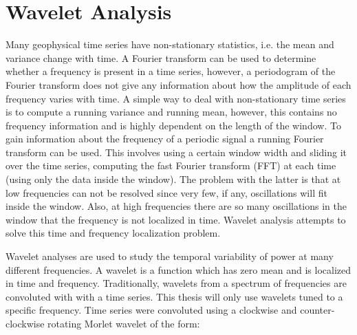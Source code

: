



\section{Wavelet Analysis}

Many geophysical time series have non-stationary statistics, i.e. the mean and variance change with time.
A Fourier transform can be used to determine whether a frequency is present in a time series, however, a periodogram of the Fourier transform does not give any information about 
how the amplitude of each frequency varies with time.  A simple way to deal with non-stationary time series is to compute a running variance and running mean, however,  this contains 
no frequency information and is highly dependent on the length of the window. To gain information about the frequency of a periodic signal a running
Fourier transform can be used. This involves using a certain window width and sliding it over the time series, computing the fast Fourier transform (FFT)
at each time (using only the data inside the window). The problem with the latter is that at low frequencies can not be resolved since very few, if any, oscillations will fit inside the window. Also, 
at high frequencies there are so many oscillations in the window that the frequency is not localized in time. Wavelet analysis attempts to solve this time and frequency localization
problem. 

Wavelet analyses are used to study the temporal variability of power at many different frequencies.  A wavelet is a function which has zero mean and 
is localized in time and frequency.  Traditionally, wavelets from a spectrum of frequencies are convoluted with with a time series. 
This thesis will only use wavelets tuned to a specific frequency. %
Time series were convoluted using a clockwise and counter-clockwise rotating Morlet wavelet of the form: 

